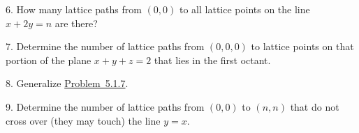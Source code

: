 \documentclass[10pt,]{book}
\theoremstyle{plain}
\theoremstyle{definition}
\theoremstyle{definition}
\numberwithin{equation}{chapter}
\begin{document}
\begin{exerciselist}
\par\smallskip
\item[6.]\hypertarget{exercise-70}{}\hypertarget{p-189}{}%
How many lattice paths from \(\left( 0,0 \right)\) to all lattice points on the line \(x + 2y = n\) are there?%
\par\smallskip
\item[7.]\hypertarget{ex-paths-to-plane}{}\hypertarget{p-190}{}%
Determine the number of lattice paths from \(\left( 0,0,0 \right)\) to lattice points on that portion of the plane \(x + y + z = 2\) that lies in the first octant.%
\par\smallskip
\item[8.]\hypertarget{exercise-72}{}\hypertarget{p-191}{}%
Generalize \hyperlink{ex-paths-to-plane}{Problem~5.1.7}.%
\par\smallskip
\item[9.]\hypertarget{exercise-73}{}\hypertarget{p-192}{}%
Determine the number of lattice paths from \(\left( 0,0 \right)\) to \((n,n)\) that do not cross over (they may touch) the line \(y = x\).%
\par\smallskip
\end{exerciselist}
\typeout{************************************************}
\typeout{************************************************}
\end{document}
